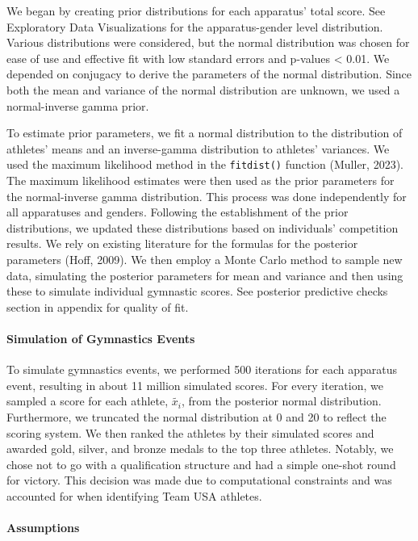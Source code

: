 \documentclass[
  10.5pt,
  letterpaper,
  DIV=11,
  numbers=noendperiod]{scrartcl}
\let\oldparagraph\paragraph
\renewcommand{\paragraph}[1]{\oldparagraph{#1}\mbox{}}
\begin{document}
We began by creating prior distributions for each apparatus' total
score. See Exploratory Data Visualizations for the apparatus-gender
level distribution. Various distributions were considered, but the
normal distribution was chosen for ease of use and effective fit with
low standard errors and p-values \textless{} 0.01. We depended on
conjugacy to derive the parameters of the normal distribution. Since
both the mean and variance of the normal distribution are unknown, we
used a normal-inverse gamma prior.

To estimate prior parameters, we fit a normal distribution to the
distribution of athletes' means and an inverse-gamma distribution to
athletes' variances. We used the maximum likelihood method in the
\texttt{fitdist()} function (Muller, 2023). The maximum likelihood
estimates were then used as the prior parameters for the normal-inverse
gamma distribution. This process was done independently for all
apparatuses and genders. Following the establishment of the prior
distributions, we updated these distributions based on individuals'
competition results. We rely on existing literature for the formulas for
the posterior parameters (Hoff, 2009). We then employ a Monte Carlo
method to sample new data, simulating the posterior parameters for mean
and variance and then using these to simulate individual gymnastic
scores. See posterior predictive checks section in appendix for quality
of fit.

\hypertarget{simulation-of-gymnastics-events}{%
\paragraph{Simulation of Gymnastics
Events}\label{simulation-of-gymnastics-events}}

To simulate gymnastics events, we performed 500 iterations for each
apparatus event, resulting in about 11 million simulated scores. For
every iteration, we sampled a score for each athlete, \(\tilde{x_i}\),
from the posterior normal distribution. Furthermore, we truncated the
normal distribution at 0 and 20 to reflect the scoring system. We then
ranked the athletes by their simulated scores and awarded gold, silver,
and bronze medals to the top three athletes. Notably, we chose not to go
with a qualification structure and had a simple one-shot round for
victory. This decision was made due to computational constraints and was
accounted for when identifying Team USA athletes.

\hypertarget{assumptions}{%
\paragraph{Assumptions}\label{assumptions}}
\end{document}
